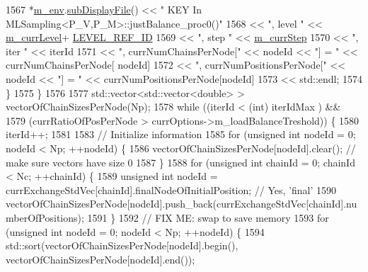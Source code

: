 \begin{DoxyCode}
1567       *\hyperlink{class_q_u_e_s_o_1_1_m_l_sampling_a13f1ca4fe9f94822fe572a743eaced1d}{m\_env}.\hyperlink{class_q_u_e_s_o_1_1_base_environment_a8a0064746ae8dddfece4229b9ad374d6}{subDisplayFile}() << \textcolor{stringliteral}{"  KEY In MLSampling<P\_V,P\_M>::justBalance\_proc0()"}
1568                               << \textcolor{stringliteral}{", level "} << \hyperlink{class_q_u_e_s_o_1_1_m_l_sampling_af9416874c856e50f3b35270e801f17e4}{m\_currLevel}+
      \hyperlink{_m_l_sampling_level_options_8h_a68d15eaf394d210effcf584b938206d3}{LEVEL\_REF\_ID}
1569                               << \textcolor{stringliteral}{", step "}  << \hyperlink{class_q_u_e_s_o_1_1_m_l_sampling_a1b1f8ccb4823bdfa26ec652f0807c63e}{m\_currStep}
1570                               << \textcolor{stringliteral}{", iter "}  << iterId
1571                               << \textcolor{stringliteral}{", currNumChainsPerNode["}    << nodeId << \textcolor{stringliteral}{"] = "} << currNumChainsPerNode[
      nodeId]
1572                               << \textcolor{stringliteral}{", currNumPositionsPerNode["} << nodeId << \textcolor{stringliteral}{"] = "} << 
      currNumPositionsPerNode[nodeId]
1573                               << std::endl;
1574     \}
1575   \}
1576 
1577   std::vector<std::vector<double> > vectorOfChainSizesPerNode(Np);
1578   \textcolor{keywordflow}{while} ((iterId                < (\textcolor{keywordtype}{int}) iterIdMax                   ) &&
1579          (currRatioOfPosPerNode > currOptions->m\_loadBalanceTreshold)) \{
1580     iterId++;
1581 
1583     \textcolor{comment}{// Initialize information}
1585 \textcolor{comment}{}    \textcolor{keywordflow}{for} (\textcolor{keywordtype}{unsigned} \textcolor{keywordtype}{int} nodeId = 0; nodeId < Np; ++nodeId) \{
1586       vectorOfChainSizesPerNode[nodeId].clear(); \textcolor{comment}{// make sure vectors have size 0}
1587     \}
1588     \textcolor{keywordflow}{for} (\textcolor{keywordtype}{unsigned} \textcolor{keywordtype}{int} chainId = 0; chainId < Nc; ++chainId) \{
1589       \textcolor{keywordtype}{unsigned} \textcolor{keywordtype}{int} nodeId = currExchangeStdVec[chainId].finalNodeOfInitialPosition; \textcolor{comment}{// Yes, 'final'}
1590       vectorOfChainSizesPerNode[nodeId].push\_back(currExchangeStdVec[chainId].numberOfPositions);
1591     \}
1592     \textcolor{comment}{// FIX ME: swap to save memory}
1593     \textcolor{keywordflow}{for} (\textcolor{keywordtype}{unsigned} \textcolor{keywordtype}{int} nodeId = 0; nodeId < Np; ++nodeId) \{
1594       std::sort(vectorOfChainSizesPerNode[nodeId].begin(), vectorOfChainSizesPerNode[nodeId].end());

\end{DoxyCode}
